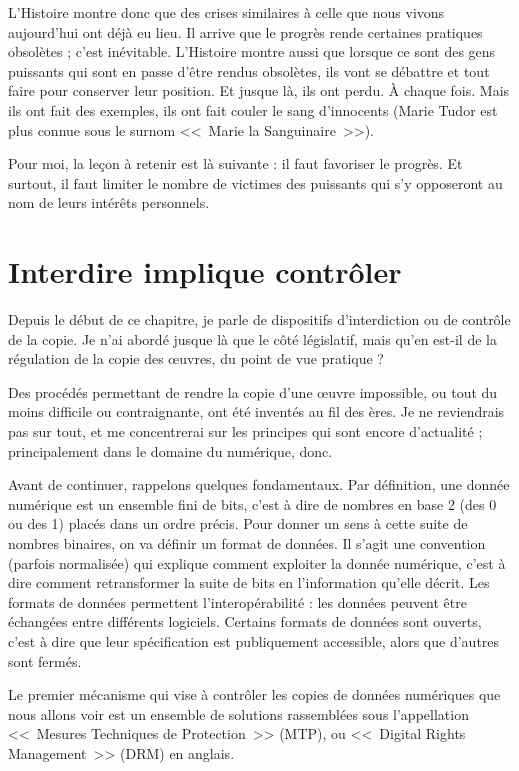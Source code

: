 L'Histoire montre donc que des crises similaires à celle que nous vivons aujourd'hui ont déjà eu lieu.
Il arrive que le progrès rende certaines pratiques obsolètes ; c'est inévitable.
L'Histoire montre aussi que lorsque ce sont des gens puissants qui sont en passe d'être rendus obsolètes, ils vont se débattre et tout faire pour conserver leur position.
Et jusque là, ils ont perdu.
À chaque fois.
Mais ils ont fait des exemples, ils ont fait couler le sang d'innocents (Marie Tudor est plus connue sous le surnom <<~Marie la Sanguinaire~>>).

Pour moi, la leçon à retenir est là suivante : il faut favoriser le progrès.
Et surtout, il faut limiter le nombre de victimes des puissants qui s'y opposeront au nom de leurs intérêts personnels.

\section{Interdire implique contrôler} %

Depuis le début de ce chapitre, je parle de dispositifs d'interdiction ou de contrôle de la copie.
Je n'ai abordé jusque là que le côté législatif, mais qu'en est-il de la régulation de la copie des œuvres, du point de vue pratique ?

Des procédés permettant de rendre la copie d'une œuvre impossible, ou tout du moins difficile ou contraignante, ont été inventés au fil des ères.
Je ne reviendrais pas sur tout, et me concentrerai sur les principes qui sont encore d'actualité ; principalement dans le domaine du numérique, donc.

Avant de continuer, rappelons quelques fondamentaux.
Par définition, une donnée numérique est un ensemble fini de bits, c'est à dire de nombres en base 2 (des 0 ou des 1) placés dans un ordre précis.
Pour donner un sens à cette suite de nombres binaires, on va définir un format de données.
Il s'agit une convention (parfois normalisée) qui explique comment exploiter la donnée numérique, c'est à dire comment retransformer la suite de bits en l'information qu'elle décrit.
Les formats de données permettent l'interopérabilité : les données peuvent être échangées entre différents logiciels.
Certains formats de données sont ouverts, c'est à dire que leur spécification est publiquement accessible, alors que d'autres sont fermés.

Le premier mécanisme qui vise à contrôler les copies de données numériques que nous allons voir est un ensemble de solutions rassemblées sous l'appellation <<~Mesures Techniques de Protection~>> (MTP), ou <<~Digital Rights Management~>> (DRM) en anglais.

